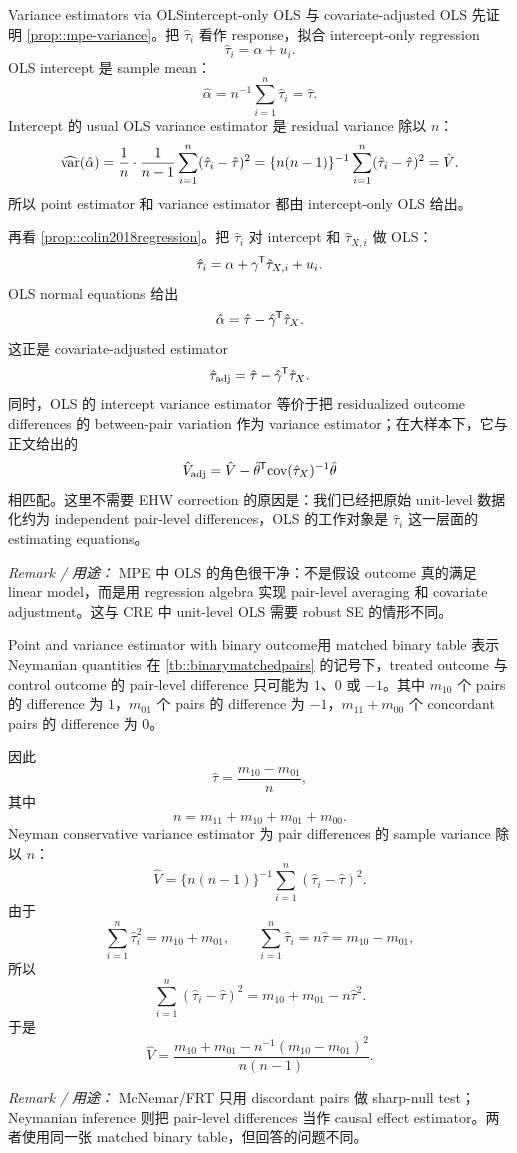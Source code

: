 \begin{exercisesolution}{Variance estimators via OLS}{intercept-only OLS 与 covariate-adjusted OLS}
先证明 \cref{prop::mpe-variance}。把 $\hat\tau_i$ 看作 response，拟合 intercept-only regression
\[
\hat\tau_i=\alpha+u_i.
\]
OLS intercept 是 sample mean：
\[
\hat\alpha=n^{-1}\sum_{i=1}^n\hat\tau_i=\hat\tau.
\]
Intercept 的 usual OLS variance estimator 是 residual variance 除以 $n$：
\[
\widehat{\textup{var}}(\hat\alpha)
=\frac{1}{n}\cdot \frac{1}{n-1}\sum_{i=1}^n(\hat\tau_i-\hat\tau)^2
=\{n(n-1)\}^{-1}\sum_{i=1}^n(\hat\tau_i-\hat\tau)^2
=\hat V.
\]
所以 point estimator 和 variance estimator 都由 intercept-only OLS 给出。

再看 \cref{prop::colin2018regression}。把 $\hat\tau_i$ 对 intercept 和 $\hat\tau_{X,i}$ 做 OLS：
\[
\hat\tau_i=\alpha+\gamma^{\mkern-1.5mu\mathsf{T}}\hat\tau_{X,i}+u_i.
\]
OLS normal equations 给出
\[
\hat\alpha=\hat\tau-\hat\gamma^{\mkern-1.5mu\mathsf{T}}\hat\tau_X.
\]
这正是 covariate-adjusted estimator
\[
\hat\tau_{\mathrm{adj}}=\hat\tau-\hat\gamma^{\mkern-1.5mu\mathsf{T}}\hat\tau_X.
\]
同时，OLS 的 intercept variance estimator 等价于把 residualized outcome differences 的 between-pair variation 作为 variance estimator；在大样本下，它与正文给出的
\[
\hat V_{\mathrm{adj}}
=\hat V-\hat\theta^{\mkern-1.5mu\mathsf{T}}\textup{cov}(\hat\tau_X)^{-1}\hat\theta
\]
相匹配。这里不需要 EHW correction 的原因是：我们已经把原始 unit-level 数据化约为 independent pair-level differences，OLS 的工作对象是 $\hat\tau_i$ 这一层面的 estimating equations。

\emph{Remark / 用途：} MPE 中 OLS 的角色很干净：不是假设 outcome 真的满足 linear model，而是用 regression algebra 实现 pair-level averaging 和 covariate adjustment。这与 CRE 中 unit-level OLS 需要 robust SE 的情形不同。
\end{exercisesolution}

\begin{exercisesolution}{Point and variance estimator with binary outcome}{用 matched binary table 表示 Neymanian quantities}
在 \cref{tb::binarymatchedpairs} 的记号下，treated outcome 与 control outcome 的 pair-level difference 只可能为 $1$、$0$ 或 $-1$。其中 $m_{10}$ 个 pairs 的 difference 为 $1$，$m_{01}$ 个 pairs 的 difference 为 $-1$，$m_{11}+m_{00}$ 个 concordant pairs 的 difference 为 $0$。

因此
\[
\hat\tau=\frac{m_{10}-m_{01}}{n},
\]
其中
\[
n=m_{11}+m_{10}+m_{01}+m_{00}.
\]
Neyman conservative variance estimator 为 pair differences 的 sample variance 除以 $n$：
\[
\hat V=\{n(n-1)\}^{-1}\sum_{i=1}^n(\hat\tau_i-\hat\tau)^2.
\]
由于
\[
\sum_{i=1}^n\hat\tau_i^2=m_{10}+m_{01},
\qquad
\sum_{i=1}^n\hat\tau_i=n\hat\tau=m_{10}-m_{01},
\]
所以
\[
\sum_{i=1}^n(\hat\tau_i-\hat\tau)^2
=m_{10}+m_{01}-n\hat\tau^2.
\]
于是
\[
\hat V
=\frac{m_{10}+m_{01}-n^{-1}(m_{10}-m_{01})^2}{n(n-1)}.
\]

\emph{Remark / 用途：} McNemar/FRT 只用 discordant pairs 做 sharp-null test；Neymanian inference 则把 pair-level differences 当作 causal effect estimator。两者使用同一张 matched binary table，但回答的问题不同。
\end{exercisesolution}

